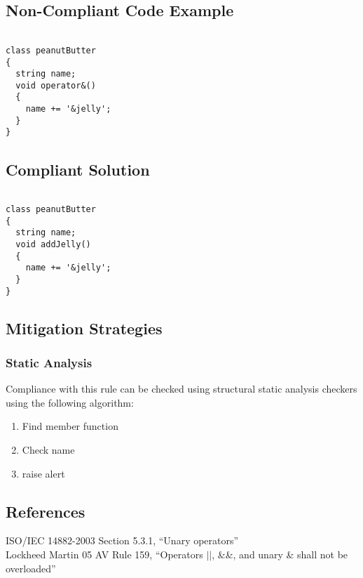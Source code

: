 \subsection{Non-Compliant Code Example}


\begin{verbatim}

class peanutButter
{
  string name;
  void operator&()
  {
    name += '&jelly';
  }
}

\end{verbatim}

\subsection{Compliant Solution}


\begin{verbatim}

class peanutButter
{
  string name;
  void addJelly()
  {
    name += '&jelly';
  }
}

\end{verbatim}

\subsection{Mitigation Strategies}
\subsubsection{Static Analysis} 

Compliance with this rule can be checked using structural static analysis checkers using the following algorithm:

\begin{enumerate}
\item Find member function
\item Check name
\item raise alert
\end{enumerate}

\subsection{References}

ISO/IEC 14882-2003 Section 5.3.1, ``Unary operators''\\
Lockheed Martin 05 AV Rule 159, ``Operators $||$, \&\&, and unary \&
    shall not be overloaded''
